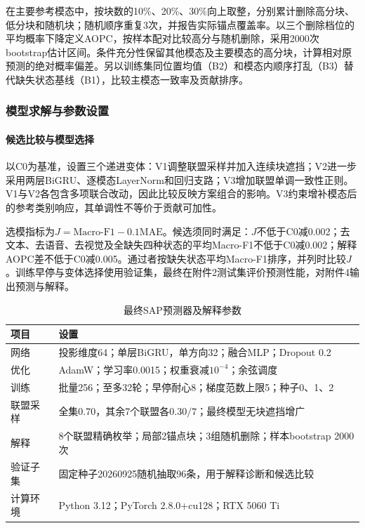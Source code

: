 在主要参考模态中，按块数的10\%、20\%、30\%向上取整，分别累计删除高分块、低分块和随机块；随机顺序重复3次，并报告实际锚点覆盖率。以三个删除档位的平均概率下降定义AOPC，按样本配对比较高分与随机删除，采用2000次bootstrap估计区间。条件充分性保留其他模态及主要模态的高分块，计算相对原预测的绝对概率偏差。另以训练集同位置均值（B2）和模态内顺序打乱（B3）替代缺失状态基线（B1），比较主模态一致率及贡献排序。

\subsubsection{模型求解与参数设置}
\paragraph{候选比较与模型选择}
以C0为基准，设置三个递进变体：V1调整联盟采样并加入连续块遮挡；V2进一步采用两层BiGRU、逐模态LayerNorm和回归支路；V3增加联盟单调一致性正则。V1与V2各包含多项联合改动，因此比较反映方案组合的影响。V3约束增补模态后的参考类别响应，其单调性不等价于贡献可加性。

选模指标为$J=\mathrm{Macro\mbox{-}F1}-0.1\mathrm{MAE}$。候选须同时满足：$J$不低于C0减0.002；去文本、去语音、去视觉及全缺失四种状态的平均Macro-F1不低于C0减0.002；解释AOPC差不低于C0减0.005。通过者按缺失状态平均Macro-F1排序，并列时比较$J$。训练早停与变体选择使用验证集，最终在附件2测试集评价预测性能，对附件4输出预测与解释。

\begin{table}[htbp]\centering\small
\caption{最终SAP预测器及解释参数}\label{q3:tab:params}
\begin{tabularx}{\linewidth}{p{3.4cm}Y}\toprule
项目 & 设置\\\midrule
网络 & 投影维度64；单层BiGRU，单方向32；融合MLP；Dropout 0.2\\
优化 & AdamW；学习率0.0015；权重衰减$10^{-4}$；余弦调度\\
训练 & 批量256；至多32轮；早停耐心8；梯度范数上限5；种子0、1、2\\
联盟采样 & 全集0.70，其余7个联盟各$0.30/7$；最终模型无块遮挡增广\\
解释 & 8个联盟精确枚举；局部2锚点块；3组随机删除；样本bootstrap 2000次\\
验证子集 & 固定种子20260925随机抽取96条，用于解释诊断和候选比较\\
计算环境 & Python 3.12；PyTorch 2.8.0+cu128；RTX 5060 Ti\\\bottomrule
\end{tabularx}\end{table}

